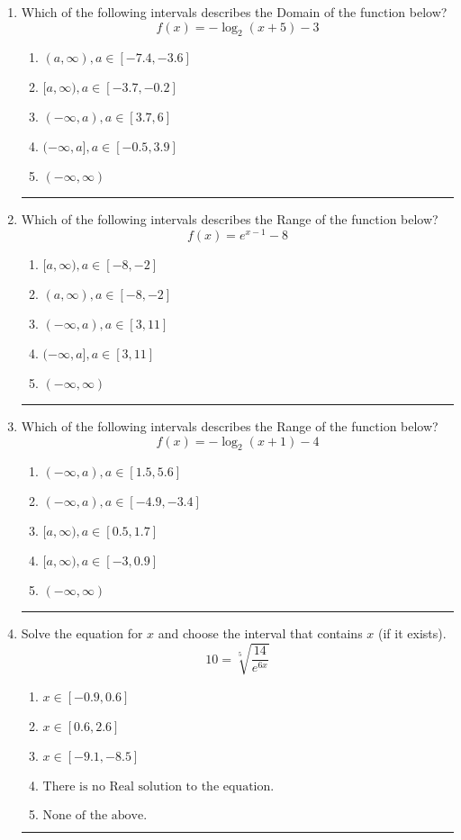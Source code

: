 \documentclass[14pt]{extbook}
\newcommand{\litem}[1]{\item#1\hspace*{-1cm}\rule{\textwidth}{0.4pt}}
\begin{document}
\begin{enumerate}
\litem{
Which of the following intervals describes the Domain of the function below?\[ f(x) = -\log_2{(x+5)}-3 \]\begin{enumerate}[label=\Alph*.]
\item \( (a, \infty), a \in [-7.4, -3.6] \)
\item \( [a, \infty), a \in [-3.7, -0.2] \)
\item \( (-\infty, a), a \in [3.7, 6] \)
\item \( (-\infty, a], a \in [-0.5, 3.9] \)
\item \( (-\infty, \infty) \)

\end{enumerate} }
\litem{
Which of the following intervals describes the Range of the function below?\[ f(x) = e^{x-1}-8 \]\begin{enumerate}[label=\Alph*.]
\item \( [a, \infty), a \in [-8, -2] \)
\item \( (a, \infty), a \in [-8, -2] \)
\item \( (-\infty, a), a \in [3, 11] \)
\item \( (-\infty, a], a \in [3, 11] \)
\item \( (-\infty, \infty) \)

\end{enumerate} }
\litem{
Which of the following intervals describes the Range of the function below?\[ f(x) = -\log_2{(x+1)}-4 \]\begin{enumerate}[label=\Alph*.]
\item \( (-\infty, a), a \in [1.5, 5.6] \)
\item \( (-\infty, a), a \in [-4.9, -3.4] \)
\item \( [a, \infty), a \in [0.5, 1.7] \)
\item \( [a, \infty), a \in [-3, 0.9] \)
\item \( (-\infty, \infty) \)

\end{enumerate} }
\litem{
 Solve the equation for $x$ and choose the interval that contains $x$ (if it exists).\[  10 = \sqrt[5]{\frac{14}{e^{6x}}} \]\begin{enumerate}[label=\Alph*.]
\item \( x \in [-0.9, 0.6] \)
\item \( x \in [0.6, 2.6] \)
\item \( x \in [-9.1, -8.5] \)
\item \( \text{There is no Real solution to the equation.} \)
\item \( \text{None of the above.} \)


\end{enumerate}}
\end{enumerate}
\end{document}
